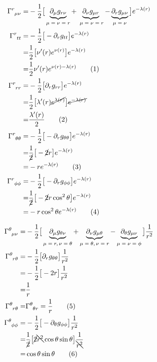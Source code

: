 \documentclass[]{article}
\newcommand\numberthis{\addtocounter{equation}{1}\tag{\theequation}}
\begin{document}
\begin{align*}
	\Gamma\indices{^r_{\mu\nu}} =& - \frac{1}{2} \big[\underbrace{ \partial_\mu g_{r\nu}}_\text{$\mu=\nu=r$} + \underbrace{\partial_\nu g_{\mu r}}_\text{ $\mu=\nu=r$} - \underbrace{\partial_r g_{\mu\nu}}_\text{$\mu=\nu$}\big] e^{-\lambda(r)}\\
	\Gamma\indices{^r_{tt}} =&-\frac{1}{2} \big[-\partial_r g_{tt}\big]e^{-\lambda(r)}\\
	=&\frac{1}{2} \big[\nu^\prime(r) e^{\nu(r)}\big] e^{-\lambda(r)}\\
	=& \frac{1}{2} \nu^\prime(r) e^{\nu(r)-\lambda(r)} \numberthis \label{eq:Gamma:rtt}\\
	\Gamma\indices{^r_{rr}} =&-\frac{1}{2}\big[\partial_r g_{rr}\big] e^{-\lambda(r)}\\
	=&\frac{1}{2}\big[\lambda^\prime(r) \cancel{e^{\lambda(r)}}\big] \cancel{e^{-\lambda(r)}}\\
	=&\frac{\lambda^\prime(r)}{2} \numberthis \label{eq:Gamma:rrr}\\
	\Gamma\indices{^r_{\theta\theta}} =&-\frac{1}{2}\big[-\partial_r g_{\theta\theta}\big] e^{-\lambda(r)}\\
	=&\frac{1}{\cancel{2}}\big[-\cancel{2} r \big] e^{-\lambda(r)}\\
	=& -r  e^{-\lambda(r)}\numberthis \label{eq:Gamma:rtHtH}\\
	\Gamma\indices{^r_{\phi\phi}} =&-\frac{1}{2} \big[-\partial_r g_{\phi\phi}\big]e^{-\lambda(r)}\\
	=&\frac{1}{\cancel{2}} \big[-\cancel{2} r \cos^2 \theta\big]e^{-\lambda(r)}\\
	=& -r \cos^2 \theta e^{-\lambda(r)} \numberthis \label{eq:Gamma:rpHpH}
\end{align*}

\begin{align*}
	\Gamma\indices{^\theta_{\mu\nu}} =&- \frac{1}{2} \big[\underbrace{ \partial_\mu g_{\theta\nu}}_\text{$\mu=r,\nu=\theta$} + \underbrace{\partial_\nu g_{\mu \theta}}_\text{$\mu=\theta,\nu=r$} - \underbrace{\partial_\theta g_{\mu\nu}}_\text{$\mu=\nu=\phi$}\big] \frac{1}{r^2} \\
	\Gamma\indices{^\theta_{r\theta}} =& - \frac{1}{2} \big[\partial_r g_{\theta\theta} \big] \frac{1}{r^2}\\
	=& - \frac{1}{2} \big[-2r \big] \frac{1}{r^2}\\
	=& \frac{1}{r} \\
	\Gamma\indices{^\theta_{r\theta}} =& \Gamma\indices{^\theta_{\theta r}} =\frac{1}{r} \numberthis \label{eq:Gamma:tHtHr}\\
	\Gamma\indices{^\theta_{\phi\phi}} =&- \frac{1}{2} \big[-\partial_\theta g_{\phi\phi}\big] \frac{1}{r^2}\\
	=& \frac{1}{\cancel{2}} \big[\cancel{2} \bcancel{r^2} \cos \theta \sin \theta\big] \frac{1}{\bcancel{r^2}}\\
	=& \cos \theta \sin \theta \numberthis \label{eq:Gamma:tHpHpH}		
\end{align*}
\end{document}
